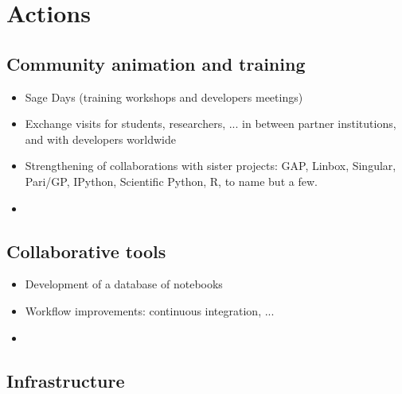 \section{Actions}


\subsection{Community animation and training}

\begin{itemize}
\item Sage Days (training workshops and developers meetings)
\item Exchange visits for students, researchers, ... in between
  partner institutions, and with developers worldwide
\item Strengthening of collaborations with sister projects: GAP,
  Linbox, Singular, Pari/GP, IPython, Scientific Python, R, to name but a
  few.
\item {}
\end{itemize}

\subsection{Collaborative tools}

\begin{itemize}
\item Development of a database of notebooks
\item Workflow improvements: continuous integration, ...
\item {}
\end{itemize}

\subsection{Infrastructure}


